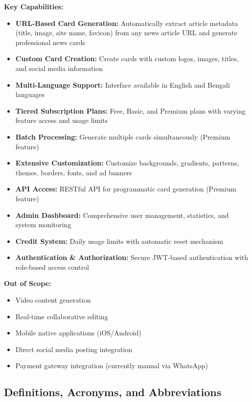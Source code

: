 \documentclass[12pt,a4paper]{article}
\begin{document}
\textbf{Key Capabilities:}
\begin{itemize}
    \item \textbf{URL-Based Card Generation:} Automatically extract article metadata (title, image, site name, favicon) from any news article URL and generate professional news cards
    \item \textbf{Custom Card Creation:} Create cards with custom logos, images, titles, and social media information
    \item \textbf{Multi-Language Support:} Interface available in English and Bengali languages
    \item \textbf{Tiered Subscription Plans:} Free, Basic, and Premium plans with varying feature access and usage limits
    \item \textbf{Batch Processing:} Generate multiple cards simultaneously (Premium feature)
    \item \textbf{Extensive Customization:} Customize backgrounds, gradients, patterns, themes, borders, fonts, and ad banners
    \item \textbf{API Access:} RESTful API for programmatic card generation (Premium feature)
    \item \textbf{Admin Dashboard:} Comprehensive user management, statistics, and system monitoring
    \item \textbf{Credit System:} Daily usage limits with automatic reset mechanism
    \item \textbf{Authentication \& Authorization:} Secure JWT-based authentication with role-based access control
\end{itemize}

\textbf{Out of Scope:}
\begin{itemize}
    \item Video content generation
    \item Real-time collaborative editing
    \item Mobile native applications (iOS/Android)
    \item Direct social media posting integration
    \item Payment gateway integration (currently manual via WhatsApp)
\end{itemize}

\subsection{Definitions, Acronyms, and Abbreviations}
\end{document}
